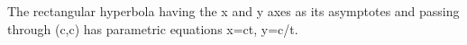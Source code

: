  The rectangular hyperbola having the x and y axes as its asymptotes and
passing through (c,c) has parametric equations 
x=ct, y=c/t.
